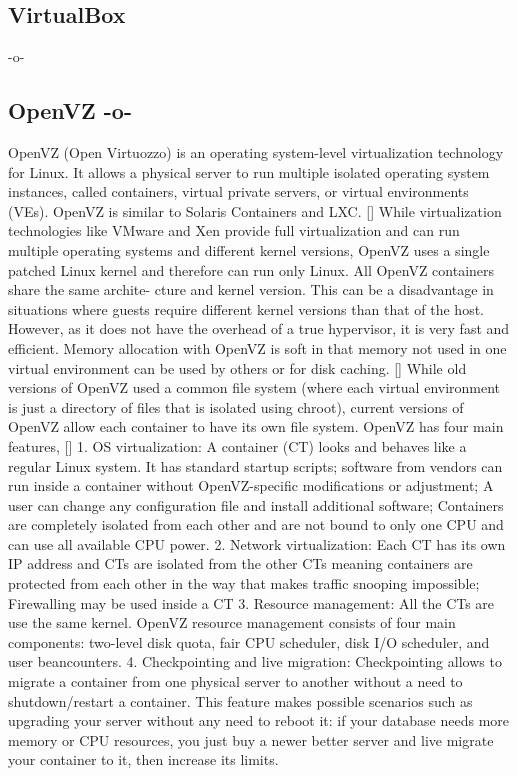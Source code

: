 \subsection{VirtualBox}

-o- 

\subsection{OpenVZ -o-}

OpenVZ (Open Virtuozzo) is an operating system-level virtualization
technology for Linux. It allows a physical server to run multiple
isolated operating system instances, called containers, virtual
private servers, or virtual environments (VEs). OpenVZ is similar to
Solaris Containers and LXC. [\cite{www-openvz-3}] While virtualization
technologies like VMware and Xen provide full virtualization and can
run multiple operating systems and different kernel versions, OpenVZ
uses a single patched Linux kernel and therefore can run only
Linux. All OpenVZ containers share the same archite- cture and kernel
version. This can be a disadvantage in situations where guests require
different kernel versions than that of the host. However, as it does
not have the overhead of a true hypervisor, it is very fast and
efficient. Memory allocation with OpenVZ is soft in that memory not
used in one virtual environment can be used by others or for disk
caching. [\cite{www-openvz-2}] While old versions of OpenVZ used a
common file system (where each virtual environment is just a directory
of files that is isolated using chroot), current versions of OpenVZ
allow each container to have its own file system.  OpenVZ has four
main features, [\cite{www-openvz-1}] 1. OS virtualization: A container
(CT) looks and behaves like a regular Linux system. It has standard
startup scripts; software from vendors can run inside a container
without OpenVZ-specific modifications or adjustment; A user can change
any configuration file and install additional software; Containers are
completely isolated from each other and are not bound to only one CPU
and can use all available CPU power.  2. Network virtualization: Each
CT has its own IP address and CTs are isolated from the other CTs
meaning containers are protected from each other in the way that makes
traffic snooping impossible; Firewalling may be used inside a CT
3. Resource management: All the CTs are use the same kernel. OpenVZ
resource management consists of four main components: two-level disk
quota, fair CPU scheduler, disk I/O scheduler, and user beancounters.
4. Checkpointing and live migration: Checkpointing allows to migrate a
container from one physical server to another without a need to
shutdown/restart a container. This feature makes possible scenarios
such as upgrading your server without any need to reboot it: if your
database needs more memory or CPU resources, you just buy a newer
better server and live migrate your container to it, then increase its
limits.


